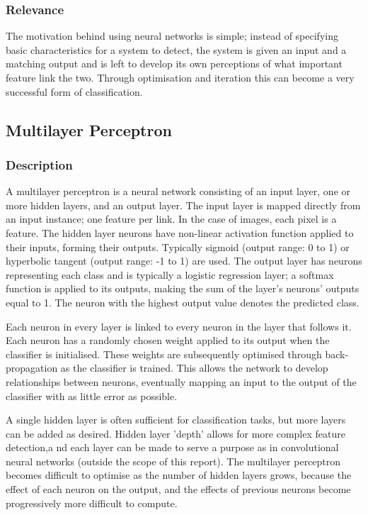 \subsubsection{Relevance}
The motivation behind using neural networks is simple; instead of specifying basic characteristics for a system to detect, the system is given an input and a matching output and is left to develop its own perceptions of what important feature link the two. Through optimisation and iteration this can become a very successful form of classification.

\subsection{Multilayer Perceptron}
\subsubsection{Description}
A multilayer perceptron is a neural network consisting of an input layer, one or more hidden layers, and an output layer. The input layer is mapped directly from an input instance; one feature per link. In the case of images, each pixel is a feature. The hidden layer neurons have non-linear activation function applied to their inputs, forming their outputs. Typically sigmoid (output range: 0 to 1) or hyperbolic tangent (output range: -1 to 1) are used. The output layer has neurons representing each class and is typically a logistic regression layer; a softmax function is applied to its outputs, making the sum of the layer's neurons' outputs equal to 1. The neuron with the highest output value denotes the predicted class\cite{ruck1990multilayer}.

Each neuron in every layer is linked to every neuron in the layer that follows it. Each neuron has a randomly chosen weight applied to its output when the classifier is initialised. These weights are subsequently optimised through back-propagation as the classifier is trained. This allows the network to develop relationships between neurons, eventually mapping an input to the output of the classifier with as little error as possible.

A single hidden layer is often sufficient for classification tasks, but more layers can be added as desired. Hidden layer 'depth' allows for more complex feature detection,a nd each layer can be made to serve a purpose as in convolutional neural networks (outside the scope of this report). The multilayer perceptron becomes difficult to optimise as the number of hidden layers grows, because the effect of each neuron on the output, and the effects of previous neurons become progressively more difficult to compute.

